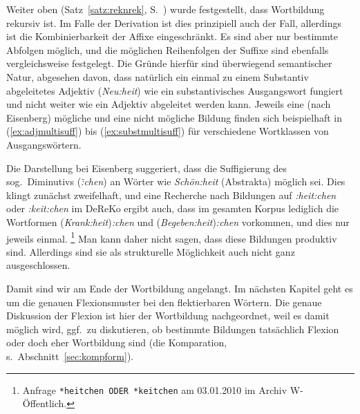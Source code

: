Weiter oben (Satz~\ref{satz:reknrek}, S.~\pageref{satz:reknrek}) wurde festgestellt, dass Wortbildung rekursiv ist.
Im Falle der Derivation ist dies prinzipiell auch der Fall, allerdings ist die Kombinierbarkeit der Affixe eingeschränkt.
Es sind aber nur bestimmte Abfolgen möglich, und die möglichen Reihenfolgen der Suffixe sind ebenfalls vergleichsweise festgelegt.
Die Gründe hierfür sind überwiegend semantischer Natur, abgesehen davon, dass natürlich \zB ein einmal zu einem Substantiv abgeleitetes Adjektiv (\textit{Neu:heit}) wie ein substantivisches Ausgangswort fungiert und nicht weiter wie ein Adjektiv abgeleitet werden kann.
Jeweils eine (nach Eisenberg) mögliche und eine nicht mögliche Bildung finden sich beispielhaft in (\ref{ex:adjmultisuff}) bis (\ref{ex:substmultisuff}) für verschiedene Wortklassen von Ausgangswörtern.

\begin{exe}
\end{exe}


Die Darstellung bei Eisenberg suggeriert, dass die Suffigierung des sog.\ Diminutivs (\textit{\~:chen}) an Wörter wie \textit{Schön:heit} (Abstrakta) möglich sei.
Dies klingt zunächst zweifelhaft, und eine Recherche nach Bildungen auf \textit{:heit:chen} oder \textit{:keit:chen} im DeReKo ergibt auch, dass im gesamten Korpus lediglich die Wortformen (\textit{Krank:heit})\textit{:chen} und (\textit{Begeben:heit})\textit{:chen} vorkommen, und dies nur jeweils einmal.%
\footnote{Anfrage \texttt{*heitchen ODER *keitchen} am 03.01.2010 im Archiv W-Öffentlich.}
Man kann daher nicht sagen, dass diese Bildungen produktiv sind.
Allerdings sind sie als strukturelle Möglichkeit auch nicht ganz ausgeschlossen.

Damit sind wir am Ende der Wortbildung angelangt.
Im nächsten Kapitel geht es um die genauen Flexionsmuster bei den flektierbaren Wörtern.
Die genaue Diskussion der Flexion ist hier der Wortbildung nachgeordnet, weil es damit möglich wird, ggf.\ zu diskutieren, ob bestimmte Bildungen tatsächlich Flexion oder doch eher Wortbildung sind (\zB die Komparation, s.\ Abschnitt~\ref{sec:kompform}).

